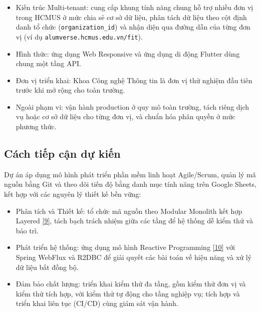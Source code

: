 \documentclass[12pt,a4paper]{article}
\begin{document}
\begin{itemize}
    \item Kiến trúc Multi-tenant: cung cấp khung tính năng chung hỗ trợ nhiều đơn vị trong HCMUS ở mức chia sẻ cơ sở dữ liệu, phân tách dữ liệu theo cột định danh tổ chức (\texttt{organization\_id}) và nhận diện qua đường dẫn của từng đơn vị (ví dụ \texttt{alumverse.hcmus.edu.vn/fit}).
    \item Hình thức: ứng dụng Web Responsive và ứng dụng di động Flutter dùng chung một tầng API.
    \item Đơn vị triển khai: Khoa Công nghệ Thông tin là đơn vị thử nghiệm đầu tiên trước khi mở rộng cho toàn trường.
    \item Ngoài phạm vi: vận hành production ở quy mô toàn trường, tách riêng dịch vụ hoặc cơ sở dữ liệu cho từng đơn vị, và chuẩn hóa phân quyền ở mức phương thức.
\end{itemize}

\subsection{Cách tiếp cận dự kiến}
\vspace{-4pt}
Dự án áp dụng mô hình phát triển phần mềm linh hoạt Agile/Scrum, quản lý mã nguồn bằng Git và theo dõi tiến độ bằng danh mục tính năng trên Google Sheets, kết hợp với các nguyên lý thiết kế bền vững:
\vspace{-4pt}
\begin{itemize}
    \item Phân tích và Thiết kế: tổ chức mã nguồn theo Modular Monolith kết hợp Layered \hyperref[ref:poeaa]{[9]}, tách bạch trách nhiệm giữa các tầng để hệ thống dễ kiểm thử và bảo trì.
    \item Phát triển hệ thống: ứng dụng mô hình Reactive Programming \hyperref[ref:reactive]{[10]} với Spring WebFlux và R2DBC để giải quyết các bài toán về hiệu năng và xử lý dữ liệu bất đồng bộ.
    \item Đảm bảo chất lượng: triển khai kiểm thử đa tầng, gồm kiểm thử đơn vị và kiểm thử tích hợp, với kiểm thử tự động cho tầng nghiệp vụ; tích hợp và triển khai liên tục (CI/CD) cùng giám sát vận hành.
\end{itemize}

\end{document}
